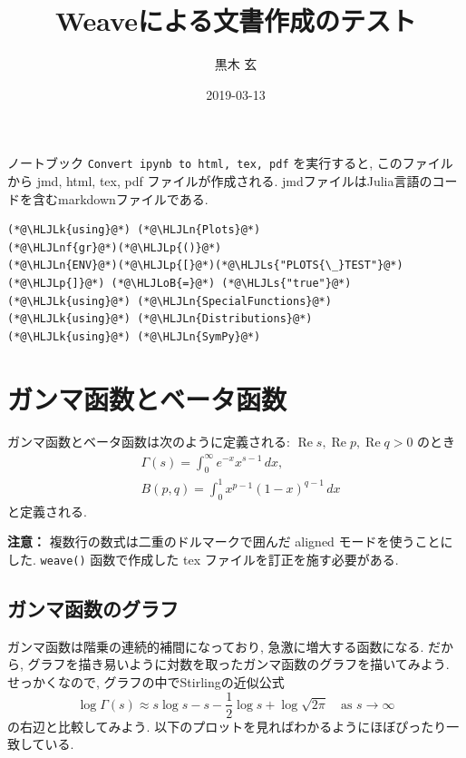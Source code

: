 \documentclass[12pt,a4paper,xelatex,ja=standard]{bxjsarticle}
\title{\bfseries Weaveによる文書作成のテスト }
\author{ 黒木 玄 }
\date{ 2019-03-13 }
\newcommand{\HLJLk}[1]{\textcolor[RGB]{148,91,176}{\textbf{#1}}}
\newcommand{\HLJLn}[1]{#1}
\newcommand{\HLJLnf}[1]{\textcolor[RGB]{66,102,213}{#1}}
\newcommand{\HLJLs}[1]{\textcolor[RGB]{201,61,57}{#1}}
\newcommand{\HLJLoB}[1]{\textcolor[RGB]{102,102,102}{\textbf{#1}}}
\newcommand{\HLJLp}[1]{#1}
\newcommand\real{\operatorname{Re}}
\begin{document}
\maketitle

\tableofcontents

ノートブック \texttt{Convert ipynb to html, tex, pdf} を実行すると, このファイルから jmd, html, tex, pdf ファイルが作成される.  jmdファイルはJulia言語のコードを含むmarkdownファイルである.


\begin{lstlisting}
(*@\HLJLk{using}@*) (*@\HLJLn{Plots}@*)
(*@\HLJLnf{gr}@*)(*@\HLJLp{()}@*)
(*@\HLJLn{ENV}@*)(*@\HLJLp{[}@*)(*@\HLJLs{"PLOTS{\_}TEST"}@*)(*@\HLJLp{]}@*) (*@\HLJLoB{=}@*) (*@\HLJLs{"true"}@*)
(*@\HLJLk{using}@*) (*@\HLJLn{SpecialFunctions}@*)
(*@\HLJLk{using}@*) (*@\HLJLn{Distributions}@*)
(*@\HLJLk{using}@*) (*@\HLJLn{SymPy}@*)
\end{lstlisting}


\section{ガンマ函数とベータ函数}
ガンマ函数とベータ函数は次のように定義される: $\real s, \real p, \real q > 0$ のとき
\[
\begin{aligned}
&
\Gamma(s) = \int_0^\infty e^{-x} x^{s-1}\,dx,
\\ &
B(p,q) = \int_0^1 x^{p-1} (1-x)^{q-1}\,dx
\end{aligned}
\]
と定義される. 

\textbf{注意：} 複数行の数式は二重のドルマークで囲んだ aligned モードを使うことにした. \texttt{weave()} 函数で作成した tex ファイルを訂正を施す必要がある.

\subsection{ガンマ函数のグラフ}
ガンマ函数は階乗の連続的補間になっており, 急激に増大する函数になる. だから, グラフを描き易いように対数を取ったガンマ函数のグラフを描いてみよう. せっかくなので, グラフの中でStirlingの近似公式
\[
\log\Gamma(s) \approx s \log s - s - \frac{1}{2}\log s + \log\sqrt{2\pi}
\quad\text{as $s\to\infty$}
\]
の右辺と比較してみよう. 以下のプロットを見ればわかるようにほぼぴったり一致している.
\end{document}
